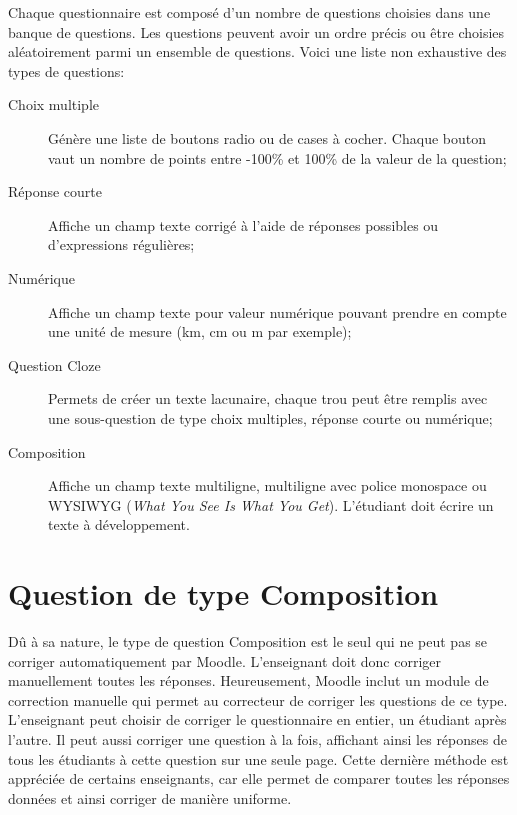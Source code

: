 Chaque questionnaire est composé d'un nombre de questions choisies dans une banque de questions.
Les questions peuvent avoir un ordre précis ou être choisies aléatoirement parmi un ensemble de questions.
Voici une liste non exhaustive des types de questions:

\begin{description}
  \item[Choix multiple]
  
  Génère une liste de boutons radio ou de cases à cocher.
  Chaque bouton vaut un nombre de points entre -100\% et 100\% de la valeur de la question;
  
  \item[Réponse courte]
  
  Affiche un champ texte corrigé à l'aide de réponses possibles ou d'expressions régulières;
  
  \item[Numérique]
  
  Affiche un champ texte pour valeur numérique pouvant prendre en compte une unité de mesure (km, cm ou m par exemple);
  
  \item[Question Cloze]
  
  Permets de créer un texte lacunaire, chaque \og trou \fg{} peut être remplis avec une sous-question de type choix multiples, réponse courte ou numérique;
  
  \item[Composition]
  
  Affiche un champ texte multiligne, multiligne avec police monospace ou WYSIWYG (\textit{What You See Is What You Get}).
  L'étudiant doit écrire un texte à développement.
\end{description}

\section{Question de type Composition}

Dû à sa nature, le type de question Composition est le seul qui ne peut pas se corriger automatiquement par Moodle.
L'enseignant doit donc corriger manuellement toutes les réponses.
Heureusement, Moodle inclut un module de correction manuelle qui permet au correcteur de corriger les questions de ce type.
L'enseignant peut choisir de corriger le questionnaire en entier, un étudiant après l'autre.
Il peut aussi corriger une question à la fois, affichant ainsi les réponses de tous les étudiants à cette question sur une seule page.
Cette dernière méthode est appréciée de certains enseignants, car elle permet de comparer toutes les réponses données et ainsi corriger de manière uniforme.

